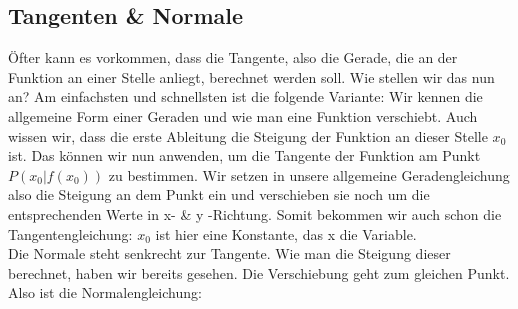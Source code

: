 \subsection{Tangenten \& Normale}
	Öfter kann es vorkommen, dass die Tangente, also die Gerade, die an der
	Funktion an einer Stelle anliegt, berechnet werden soll. Wie stellen wir das
	nun an? Am einfachsten und schnellsten ist die folgende Variante: Wir kennen
	die allgemeine Form einer Geraden und wie man eine Funktion verschiebt. Auch
	wissen wir, dass die erste Ableitung die Steigung der Funktion an dieser Stelle
	\(x_0\) ist. Das können wir nun anwenden, um die Tangente der Funktion am Punkt
	\(P(x_0|f(x_0))\) zu bestimmen. Wir setzen in unsere allgemeine
	Geradengleichung also die Steigung an dem Punkt ein und verschieben sie noch um
	die entsprechenden Werte in x- \& y -Richtung. Somit bekommen wir auch schon
	die Tangentengleichung:
	\formel{\[t(x)=f'(x_0)\cdot (x-x_0)+f(x_0)\]}
	\(x_0\) ist hier eine Konstante, das x die Variable.\\
	Die Normale steht senkrecht zur Tangente. Wie man die Steigung dieser
	berechnet, haben wir bereits gesehen. Die Verschiebung geht zum gleichen Punkt.
	Also ist die Normalengleichung:
	\formel{\[n(x)=-\frac{1}{f'(x_0)}\cdot (x-x_0)+f(x_0)\]}
